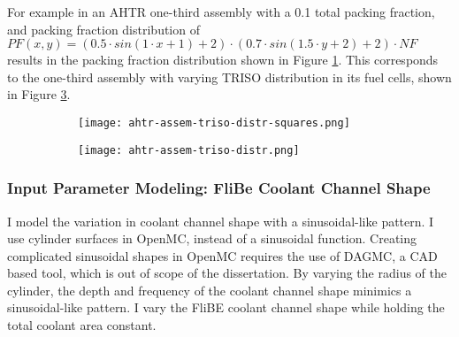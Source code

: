 For example in an \gls{AHTR} one-third assembly with a 0.1 total packing fraction, and packing 
fraction distribution of $PF(x, y) = \left(0.5\cdot sin(1\cdot x + 1) + 2\right) \cdot 
\left(0.7\cdot sin(1.5\cdot y + 2) + 2\right) \cdot NF$ results in the packing fraction 
distribution shown in Figure \ref{fig:ahtr-assem-triso-distr-squares}.
This corresponds to the one-third assembly with varying TRISO distribution in its fuel 
cells, shown in Figure \ref{fig:ahtr-assem-triso-distr}. 
\begin{figure}[]
    \centering
    \begin{subfigure}{0.49\textwidth}
        \texttt{[image: ahtr-assem-triso-distr-squares.png]}
        \caption{}
        \label{fig:ahtr-assem-triso-distr-squares} 
    \end{subfigure}
    \begin{subfigure}{0.49\textwidth}
        \texttt{[image: ahtr-assem-triso-distr.png]}
        \raggedleft
        \caption{}
        \label{fig:ahtr-assem-triso-distr} 
    \end{subfigure}
    \caption{}
\end{figure}

\subsubsection{Input Parameter Modeling: FliBe Coolant Channel Shape}
I model the variation in coolant channel shape with a sinusoidal-like pattern.
I use cylinder surfaces in OpenMC, instead of a sinusoidal function. 
Creating complicated sinusoidal shapes in OpenMC requires the use of DAGMC, a CAD based tool, 
which is out of scope of the dissertation.
By varying the radius of the cylinder, the depth and frequency of the coolant channel shape 
minimics a sinusoidal-like pattern.
I vary the FliBE coolant channel shape while holding the total coolant area constant. 

